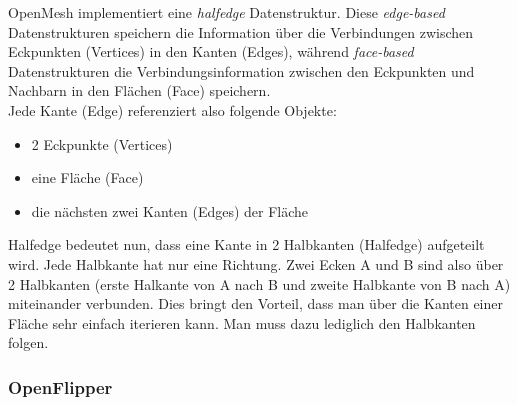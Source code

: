 OpenMesh implementiert eine \emph{halfedge} Datenstruktur.
Diese \emph{edge-based} Datenstrukturen speichern die Information über die Verbindungen zwischen Eckpunkten (Vertices) in den Kanten (Edges), während
\emph{face-based} Datenstrukturen die Verbindungsinformation zwischen den Eckpunkten und Nachbarn in den Flächen (Face) speichern.\\
Jede Kante (Edge) referenziert also folgende Objekte:
\begin{itemize}
	\item 2 Eckpunkte (Vertices)
	\item eine Fläche (Face)
	\item die nächsten zwei Kanten (Edges) der Fläche
\end{itemize}

Halfedge bedeutet nun, dass eine Kante in 2 Halbkanten (Halfedge) aufgeteilt wird. Jede Halbkante hat nur eine Richtung.
Zwei Ecken A und B sind also über 2 Halbkanten (erste Halkante von A nach B und zweite Halbkante von B nach A) miteinander verbunden.
Dies bringt den Vorteil, dass man über die Kanten einer Fläche sehr einfach iterieren kann. Man muss dazu lediglich den Halbkanten folgen.


\subsubsection{OpenFlipper}

